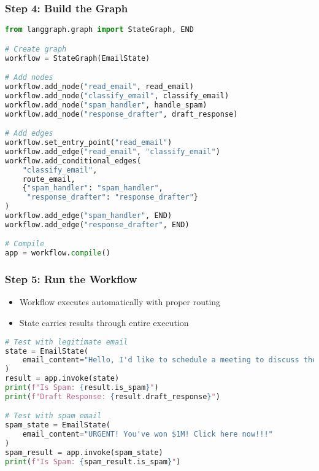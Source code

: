 \begin{frame}[fragile]\frametitle{Step 4: Build the Graph}
      \begin{lstlisting}[language=Python, basicstyle=\tiny]
from langgraph.graph import StateGraph, END

# Create graph
workflow = StateGraph(EmailState)

# Add nodes
workflow.add_node("read_email", read_email)
workflow.add_node("classify_email", classify_email)
workflow.add_node("spam_handler", handle_spam)
workflow.add_node("response_drafter", draft_response)

# Add edges
workflow.set_entry_point("read_email")
workflow.add_edge("read_email", "classify_email")
workflow.add_conditional_edges(
    "classify_email",
    route_email,
    {"spam_handler": "spam_handler", 
     "response_drafter": "response_drafter"}
)
workflow.add_edge("spam_handler", END)
workflow.add_edge("response_drafter", END)

# Compile
app = workflow.compile()
      \end{lstlisting}
\end{frame}

\begin{frame}[fragile]\frametitle{Step 5: Run the Workflow}

      \begin{itemize}
        \item Workflow executes automatically with proper routing
        \item State carries results through entire execution
      \end{itemize}
	  
      \begin{lstlisting}[language=Python, basicstyle=\small]
# Test with legitimate email
state = EmailState(
    email_content="Hello, I'd like to schedule a meeting to discuss the project timeline."
)
result = app.invoke(state)
print(f"Is Spam: {result.is_spam}")
print(f"Draft Response: {result.draft_response}")

# Test with spam email
spam_state = EmailState(
    email_content="URGENT! You've won $1M! Click here now!!!"
)
spam_result = app.invoke(spam_state)
print(f"Is Spam: {spam_result.is_spam}")
      \end{lstlisting}
      

\end{frame}

